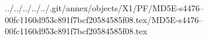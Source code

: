 ../../../../../.git/annex/objects/X1/PF/MD5E-s4476--00fc1160d953c891f7bcf20584585f08.tex/MD5E-s4476--00fc1160d953c891f7bcf20584585f08.tex